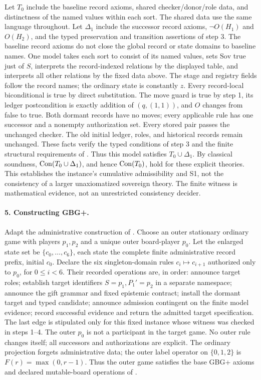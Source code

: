 \documentclass[11pt]{article}
\theoremstyle{definition}\newtheorem{definition}[theorem]{Definition}
\begin{document}
Let $T_0$ include the baseline record axioms, shared checker/donor/role data, and distinctness of the named values within each sort. The shared data use the same language throughout. Let $\Delta_1$ include the successor record axioms, $\neg O(H_1)$ and $O(H_2)$, and the typed preservation and transition assertions of step 3. The baseline record axioms do not close the global record or state domains to baseline names. One model takes each sort to consist of its named values, sets $\mathrm{Sov}$ true just of $S$, interprets the record-indexed relations by the displayed table, and interprets all other relations by the fixed data above. The stage and registry fields follow the record names; the ordinary state is constantly $z$. Every record-local biconditional is true by direct substitution. The move guard is true by step 1, its ledger postcondition is exactly addition of $(q,(1,1))$, and $O$ changes from false to true. Both dormant records have no moves; every applicable rule has one successor and a nonempty authorization set. Every stored pair passes the unchanged checker. The old initial ledger, roles, and historical records remain unchanged. These facts verify the typed conditions of step 3 and the finite structural requirements of \cite[Defs.~3.1, 6.1, 7.1, 13.1]{gift}. Thus this model satisfies $T_0\cup\Delta_1$. By classical soundness, $\operatorname{Con}(T_0\cup\Delta_1)$, and hence $\operatorname{Con}(T_0)$, hold for these explicit theories. This establishes the instance's cumulative admissibility and S1, not the consistency of a larger unaxiomatized sovereign theory. The finite witness is mathematical evidence, not an unrestricted consistency decider.
\paragraph{5. Constructing GBG+.} Adapt the administrative construction of \cite[App.~A.37]{gift}. Choose an outer stationary ordinary game with players $p_1,p_2$ and a unique outer board-player $p_0$. Let the enlarged state set be $\{c_0,\ldots,c_6\}$, each state the complete finite administrative record prefix, initial $c_0$. Declare the six singleton-domain rules $c_i\mapsto c_{i+1}$ authorized only to $p_0$, for $0\le i<6$. Their recorded operations are, in order: announce target roles; establish target identifiers $S=p_1,P_1'=p_2$ in a separate namespace; announce the gift grammar and fixed epistemic contract; install the dormant target and typed candidate; announce admission contingent on the finite model evidence; record successful evidence and return the admitted target specification. The last edge is stipulated only for this fixed instance whose witness was checked in steps 1--4. The outer $p_0$ is not a participant in the target game. No outer rule changes itself; all successors and authorizations are explicit. The ordinary projection forgets administrative data; the outer label operator on $\{0,1,2\}$ is $F(r)=\max(0,r-1)$. Thus the outer game satisfies the base GBG+ axioms and declared mutable-board operations of \cite[Sec.~24]{gbg}.
\end{document}
